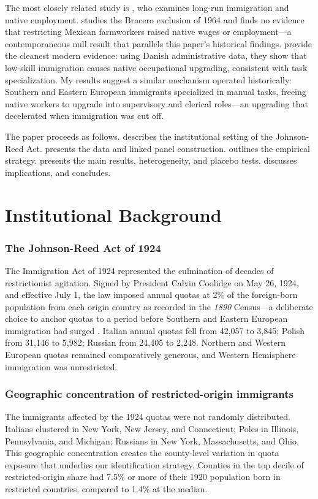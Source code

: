 \documentclass[12pt]{article}
\begin{document}
The most closely related study is \citet{ward2023}, who examines long-run immigration and native employment. \citet{clemens2022} studies the Bracero exclusion of 1964 and finds no evidence that restricting Mexican farmworkers raised native wages or employment---a contemporaneous null result that parallels this paper's historical findings. \citet{fogedperi2016} provide the cleanest modern evidence: using Danish administrative data, they show that low-skill immigration causes native occupational upgrading, consistent with task specialization. My results suggest a similar mechanism operated historically: Southern and Eastern European immigrants specialized in manual tasks, freeing native workers to upgrade into supervisory and clerical roles---an upgrading that decelerated when immigration was cut off.

The paper proceeds as follows.  describes the institutional setting of the Johnson-Reed Act.  presents the data and linked panel construction.  outlines the empirical strategy.  presents the main results, heterogeneity, and placebo tests.  discusses implications, and  concludes.


\section{Institutional Background}
\label{sec:background}

\subsubsection*{The Johnson-Reed Act of 1924} The Immigration Act of 1924 represented the culmination of decades of restrictionist agitation. Signed by President Calvin Coolidge on May 26, 1924, and effective July 1, the law imposed annual quotas at 2\% of the foreign-born population from each origin country as recorded in the \emph{1890} Census---a deliberate choice to anchor quotas to a period before Southern and Eastern European immigration had surged \citep{goldin1994}. Italian annual quotas fell from 42,057 to 3,845; Polish from 31,146 to 5,982; Russian from 24,405 to 2,248. Northern and Western European quotas remained comparatively generous, and Western Hemisphere immigration was unrestricted.

\subsubsection*{Geographic concentration of restricted-origin immigrants} The immigrants affected by the 1924 quotas were not randomly distributed. Italians clustered in New York, New Jersey, and Connecticut; Poles in Illinois, Pennsylvania, and Michigan; Russians in New York, Massachusetts, and Ohio. This geographic concentration creates the county-level variation in quota exposure that underlies our identification strategy. Counties in the top decile of restricted-origin share had 7.5\% or more of their 1920 population born in restricted countries, compared to 1.4\% at the median.
\end{document}
